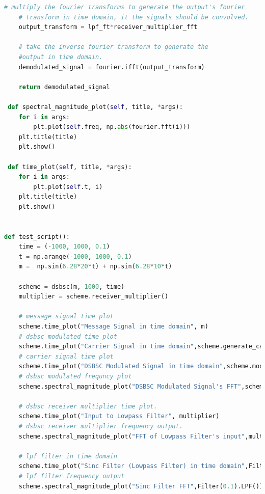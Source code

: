 \documentclass[12pt,a4paper]{article}%
\begin{document}
\begin{flushleft}
\begin{lstlisting}[language=python]
	# multiply the fourier transforms to generate the output's fourier
	# transform in time domain, it the signals should be convolved.
	output_transform = lpf_ft*receiver_multiplier_fft
	
	# take the inverse fourier transform to generate the 
	#output in time domain.
	demodulated_signal = fourier.ifft(output_transform)
	
	return demodulated_signal

 def spectral_magnitude_plot(self, title, *args):
	for i in args:
		plt.plot(self.freq, np.abs(fourier.fft(i)))
	plt.title(title)
	plt.show()

 def time_plot(self, title, *args):
	for i in args:
		plt.plot(self.t, i)
	plt.title(title)
	plt.show()


def test_script():
	time = (-1000, 1000, 0.1)
	t = np.arange(-1000, 1000, 0.1)
	m =  np.sin(6.28*20*t) + np.sin(6.28*10*t)

	scheme = dsbsc(m, 1000, time)
	multiplier = scheme.receiver_multiplier()
	
	# message signal time plot
	scheme.time_plot("Message Signal in time domain", m)
	# dsbsc modulated time plot
	scheme.time_plot("Carrier Signal in time domain",scheme.generate_carrier())
	# carrier signal time plot
	scheme.time_plot("DSBSC Modulated Signal in time domain",scheme.modulate())
	# dsbsc modulated frequncy plot
	scheme.spectral_magnitude_plot("DSBSC Modulated Signal's FFT",scheme.modulate())
	
	# dsbsc receiver multiplier time plot.
	scheme.time_plot("Input to Lowpass Filter", multiplier)
	# dsbsc receiver multiplier frequency output.
	scheme.spectral_magnitude_plot("FFT of Lowpass Filter's input",multiplier)
	
	# lpf filter in time domain
	scheme.time_plot("Sinc Filter (Lowpass Filter) in time domain",Filter(0.1).LPF())
	# lpf filter frequency output
	scheme.spectral_magnitude_plot("Sinc Filter FFT",Filter(0.1).LPF())
	

\end{lstlisting}
\end{flushleft}
\end{document}
